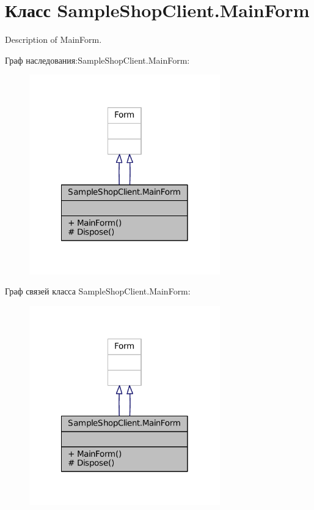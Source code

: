 \hypertarget{class_sample_shop_client_1_1_main_form}{}\section{Класс Sample\+Shop\+Client.\+Main\+Form}
\label{class_sample_shop_client_1_1_main_form}


Description of Main\+Form.  




Граф наследования\+:Sample\+Shop\+Client.\+Main\+Form\+:
\nopagebreak
\begin{figure}[H]
\begin{center}
\leavevmode
\includegraphics[width=234pt]{class_sample_shop_client_1_1_main_form__inherit__graph}
\end{center}
\end{figure}


Граф связей класса Sample\+Shop\+Client.\+Main\+Form\+:
\nopagebreak
\begin{figure}[H]
\begin{center}
\leavevmode
\includegraphics[width=234pt]{class_sample_shop_client_1_1_main_form__coll__graph}
\end{center}
\end{figure}

